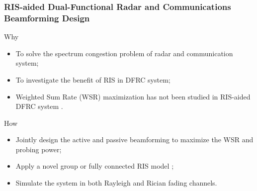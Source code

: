 \begin{frame}
    \frametitle{RIS-aided Dual-Functional Radar and Communications Beamforming Design}

    \begin{block}{Why}
        \begin{itemize}
        \small
        \item To solve the spectrum congestion problem of radar and communication system;
        \item To investigate the benefit of RIS in DFRC system;
        \item Weighted Sum Rate (WSR) maximization has not been studied in RIS-aided DFRC system \cite{wang2020ris, jiang2021dfrc, wang2021joint}.
        \end{itemize}    
    \end{block}

    \begin{block}{How}
        \begin{itemize}
        \small
        \item Jointly design the active and passive beamforming to maximize the WSR and probing power;
        \item Apply a novel group or fully connected RIS model \cite{shen2020modeling};
        \item Simulate the system in both Rayleigh and Rician fading channels.
        \end{itemize}    
    \end{block}
\end{frame}

